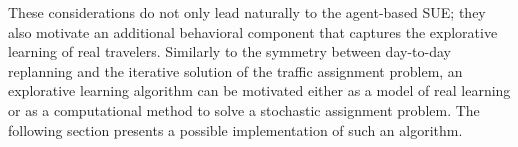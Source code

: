 These considerations do not only lead naturally to the agent-based SUE;
they also motivate an additional behavioral component that captures
the explorative learning of real travelers. Similarly to the symmetry
between day-to-day replanning and the iterative solution of the traffic assignment
problem, an explorative learning algorithm can be motivated either as
a model of real learning or as a computational method to solve a stochastic
assignment problem. The following section presents a possible implementation
of such an algorithm. 



